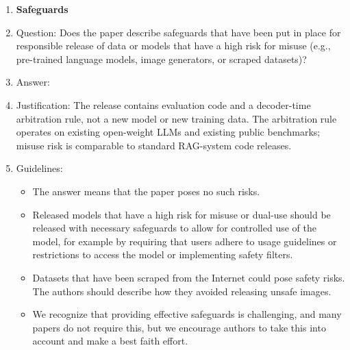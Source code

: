\begin{enumerate}
\begin{itemize}
        \item If there are negative societal impacts, the authors could also discuss possible mitigation strategies (e.g., gated release of models, providing defenses in addition to attacks, mechanisms for monitoring misuse, mechanisms to monitor how a system learns from feedback over time, improving the efficiency and accessibility of ML).
    \end{itemize}

\item \textbf{Safeguards}
    \item[] Question: Does the paper describe safeguards that have been put in place for responsible release of data or models that have a high risk for misuse (e.g., pre-trained language models, image generators, or scraped datasets)?
    \item[] Answer: \answerNA{}
    \item[] Justification: The release contains evaluation code and a decoder-time arbitration rule, not a new model or new training data. The arbitration rule operates on existing open-weight LLMs and existing public benchmarks; misuse risk is comparable to standard RAG-system code releases.
    \item[] Guidelines:
    \begin{itemize}
        \item The answer \answerNA{} means that the paper poses no such risks.
        \item Released models that have a high risk for misuse or dual-use should be released with necessary safeguards to allow for controlled use of the model, for example by requiring that users adhere to usage guidelines or restrictions to access the model or implementing safety filters.
        \item Datasets that have been scraped from the Internet could pose safety risks. The authors should describe how they avoided releasing unsafe images.
        \item We recognize that providing effective safeguards is challenging, and many papers do not require this, but we encourage authors to take this into account and make a best faith effort.
    \end{itemize}


\end{enumerate}

